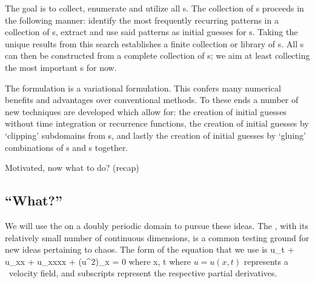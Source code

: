 The goal is to collect, enumerate and utilize all {\fpo}s.
The collection of {\fpo}s proceeds in the following manner:
identify the most frequently recurring patterns in a collection of {\po}s,
extract and use said patterns as initial guesses for {\fpo}s. Taking the
unique results from this search establishes a finite collection or library
of {\fpo}s.
All {\po}s can then be constructed from a complete collection of {\fpo}s; we
aim at least collecting the most important {\fpo}s for now.


The {\spt} formulation is a variational formulation.
This confers many numerical benefits and advantages over conventional methods.
To these ends a number of new techniques are developed which allow for:
the creation of initial guesses without time integration or recurrence functions,
the creation of  initial guesses by `clipping' subdomains from {\po}s,
and lastly the creation of initial guesses by
`gluing' {\spt} combinations of {\po}s and {\fpo}s together.


Motivated, now what to do? (recap)\subsection{``What?''}
We will use the {\KSe} on a doubly periodic {\spt} domain to pursue these ideas.
The {\KSe}, with its relatively small number of continuous dimensions, is a common testing ground for new ideas
pertaining to {\spt} chaos.
The form of the equation that we use is
\beq \label{e-ks}
u_t + u_{xx} + u_{xxxx} + (u^2)_x = 0 \quad \mbox{where} \quad x\in[0,\speriod{}], t\in[0,\period{}]
\eeq
where $u = u(x, t)$ represents a \spt\ velocity field, and subscripts
represent the respective partial derivatives.

